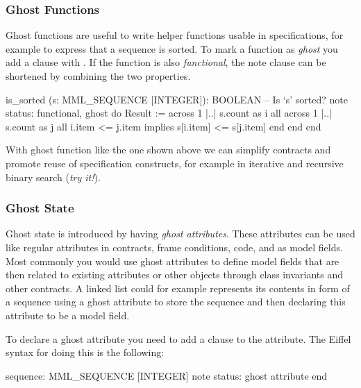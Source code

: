 \subsubsection*{Ghost Functions}

Ghost functions are useful to write helper functions usable in specifications, for example to express that a sequence is sorted. To mark a function as \emph{ghost} you add a  clause with . If the function is also \emph{functional}, the note clause can be shortened by combining the two  properties.

\begin{erunning}
is_sorted (s: MML_SEQUENCE [INTEGER]): BOOLEAN
		-- Is `s' sorted?
	note
		status: functional, ghost
	do
		Result := across 1 |..| s.count as i all
		            across 1 |..| s.count as j all
		              i.item <= j.item implies s[i.item] <= s[j.item] end end
	end
\end{erunning}

With ghost function like the one shown above we can simplify contracts and promote reuse of specification constructs, for example in iterative and recursive binary search (\emph{try it!}).

\subsubsection*{Ghost State}

Ghost state is introduced by having \emph{ghost attributes}. These attributes can be used like regular attributes in contracts, frame conditions, code, and as model fields. Most commonly you would use ghost attributes to define model fields that are then related to existing attributes or other objects through class invariants and other contracts. A linked list could for example represents its contents in form of a sequence using a ghost attribute to store the sequence and then declaring this attribute to be a model field.

To declare a ghost attribute you need to add a  clause to the attribute. The Eiffel syntax for doing this is the following:

\begin{erunning}
sequence: MML_SEQUENCE [INTEGER]
	note status: ghost
	attribute
	end
\end{erunning}

